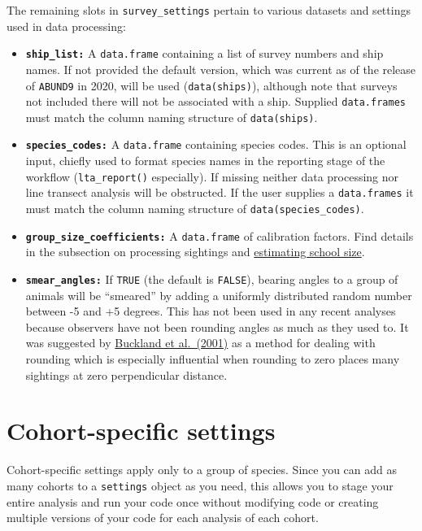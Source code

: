 \documentclass[
]{book}
\begin{document}
The remaining slots in \texttt{survey\_settings} pertain to various datasets and settings used in data processing:

\begin{itemize}
\item
  \textbf{\texttt{ship\_list:}} A \texttt{data.frame} containing a list of survey numbers and ship names. If not provided the default version, which was current as of the release of \texttt{ABUND9} in 2020, will be used (\texttt{data(ships)}), although note that surveys not included there will not be associated with a ship. Supplied \texttt{data.frames} must match the column naming structure of \texttt{data(ships)}.
\item
  \textbf{\texttt{species\_codes:}} A \texttt{data.frame} containing species codes. This is an optional input, chiefly used to format species names in the reporting stage of the workflow (\texttt{lta\_report()} especially). If missing neither data processing nor line transect analysis will be obstructed. If the user supplies a \texttt{data.frames} it must match the column naming structure of \texttt{data(species\_codes)}.
\item
  \textbf{\texttt{group\_size\_coefficients:}} A \texttt{data.frame} of calibration factors. Find details in the subsection on processing sightings and \protect\hyperlink{ss_calibration}{estimating school size}.
\item
  \textbf{\texttt{smear\_angles:}} If \texttt{TRUE} (the default is \texttt{FALSE}), bearing angles to a group of animals will be ``smeared'' by adding a uniformly distributed random number between -5 and +5 degrees. This has not been used in any recent analyses because observers have not been rounding angles as much as they used to. It was suggested by \href{https://distancesampling.org/whatisds.html\#books}{Buckland et al.~(2001)} as a method for dealing with rounding which is especially influential when rounding to zero places many sightings at zero perpendicular distance.
\end{itemize}

\hypertarget{cohort-specific-settings}{%
\section*{Cohort-specific settings}\label{cohort-specific-settings}}

Cohort-specific settings apply only to a group of species. Since you can add as many cohorts to a \texttt{settings} object as you need, this allows you to stage your entire analysis and run your code once without modifying code or creating multiple versions of your code for each analysis of each cohort.
\end{document}
